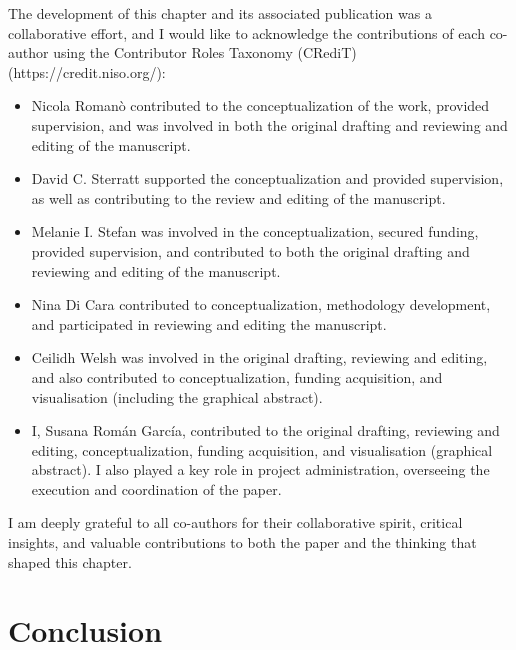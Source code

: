 \documentclass[
  11pt,
  letterpaper,
]{scrreprt}
\begin{document}
The development of this chapter and its associated publication was a
collaborative effort, and I would like to acknowledge the contributions
of each co-author using the Contributor Roles Taxonomy (CRediT)
(https://credit.niso.org/):

\begin{itemize}
\item
  Nicola Romanò contributed to the conceptualization of the work,
  provided supervision, and was involved in both the original drafting
  and reviewing and editing of the manuscript.
\item
  David C. Sterratt supported the conceptualization and provided
  supervision, as well as contributing to the review and editing of the
  manuscript.
\item
  Melanie I. Stefan was involved in the conceptualization, secured
  funding, provided supervision, and contributed to both the original
  drafting and reviewing and editing of the manuscript.
\item
  Nina Di Cara contributed to conceptualization, methodology
  development, and participated in reviewing and editing the manuscript.
\item
  Ceilidh Welsh was involved in the original drafting, reviewing and
  editing, and also contributed to conceptualization, funding
  acquisition, and visualisation (including the graphical abstract).
\item
  I, Susana Román García, contributed to the original drafting,
  reviewing and editing, conceptualization, funding acquisition, and
  visualisation (graphical abstract). I also played a key role in
  project administration, overseeing the execution and coordination of
  the paper.
\end{itemize}

I am deeply grateful to all co-authors for their collaborative spirit,
critical insights, and valuable contributions to both the paper and the
thinking that shaped this chapter.

\newpage
{}

\pagestyle{plain}



\newpage 
\restoregeometry

\section*{Conclusion}\label{conclusion}
\end{document}
